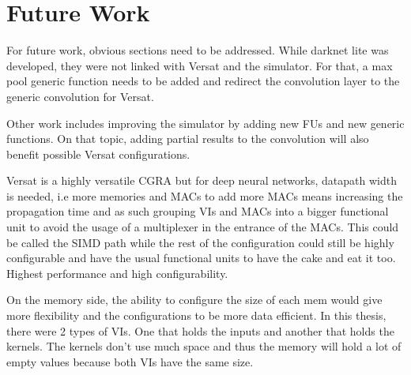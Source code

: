 \section{Future Work}
\label{section:future}

For future work, obvious sections need to be addressed. While darknet lite was developed,
they were not linked with Versat and the simulator. For that, a max pool generic function
needs to be added and redirect the convolution layer to the generic convolution for Versat.

Other work includes improving the simulator by adding new FUs and new generic functions. On that
topic, adding partial results to the convolution will also benefit possible Versat configurations.

Versat is a highly versatile CGRA but for deep neural networks, datapath width is needed, i.e
more memories and MACs to add more MACs means increasing the propagation time and as such
grouping VIs and MACs into a bigger functional unit to avoid the usage of a multiplexer
in the entrance of the MACs. This could be called the SIMD path while the rest of the configuration
could still be highly configurable and have the usual functional units to have the cake and eat it too.
Highest performance and high configurability.

On the memory side, the ability to configure the size of each mem would give more flexibility
and the configurations to be more data efficient. In this thesis, there were 2 types of VIs. One
that holds the inputs and another that holds the kernels. The kernels don't use much space and thus
the memory will hold a lot of empty values because both VIs have the same size.


